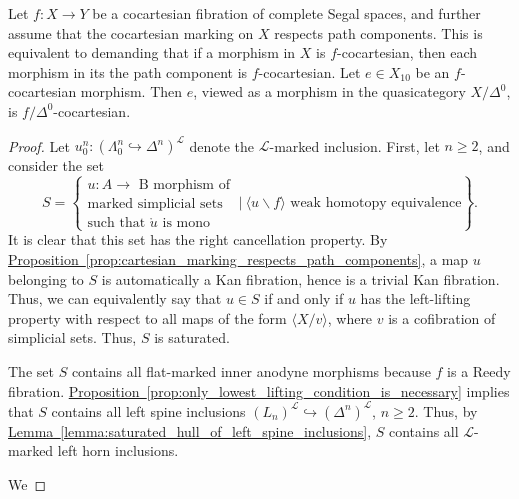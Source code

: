\documentclass[main.tex]{subfiles}
\begin{document}
\begin{proposition}
  \label{prop:segal_cocartesian_morphisms_are_quasicategory_cocartesian}
  Let $f\colon X \to Y$ be a cocartesian fibration of complete Segal spaces, and further assume that the cocartesian marking on $X$ respects path components. This is equivalent to demanding that if a morphism in $X$ is $f$-cocartesian, then each morphism in its the path component is $f$-cocartesian. Let $e \in X_{10}$ be an $f$-cocartesian morphism. Then $e$, viewed as a morphism in the quasicategory $X / \Delta^{0}$, is $f / \Delta^{0}$-cocartesian.
\end{proposition}
\begin{proof}
  Let $u^{n}_{0}\colon (\Lambda^{n}_{0} \hookrightarrow \Delta^{n})^{\mathcal{L}}$ denote the $\mathcal{L}$-marked inclusion. First, let $n \geq 2$, and consider the set
  \begin{equation*}
    S =
    \left\{
      \substack{
        u\colon A \to \text{ B morphism of} \\
        \text{marked simplicial sets} \\
        \text{such that $\mathring{u}$ is mono}
      }
      \ \bigg| \
      \langle u \backslash f \rangle \text{ weak homotopy equivalence}
    \right\}.
  \end{equation*}
  It is clear that this set has the right cancellation property. By \hyperref[prop:cartesian_marking_respects_path_components]{Proposition~\ref*{prop:cartesian_marking_respects_path_components}}, a map $u$ belonging to $S$ is automatically a Kan fibration, hence is a trivial Kan fibration. Thus, we can equivalently say that $u \in S$ if and only if $u$ has the left-lifting property with respect to all maps of the form $\langle X / v \rangle$, where $v$ is a cofibration of simplicial sets. Thus, $S$ is saturated.

  The set $S$ contains all flat-marked inner anodyne morphisms because $f$ is a Reedy fibration. \hyperref[prop:only_lowest_lifting_condition_is_necessary]{Proposition~\ref*{prop:only_lowest_lifting_condition_is_necessary}} implies that $S$ contains all left spine inclusions $(L_{n})^{\mathcal{L}} \hookrightarrow (\Delta^{n})^{\mathcal{L}}$, $n \geq 2$. Thus, by \hyperref[lemma:saturated_hull_of_left_spine_inclusions]{Lemma~\ref*{lemma:saturated_hull_of_left_spine_inclusions}}, $S$ contains all $\mathcal{L}$-marked left horn inclusions.

  We
\end{proof}
\end{document}
